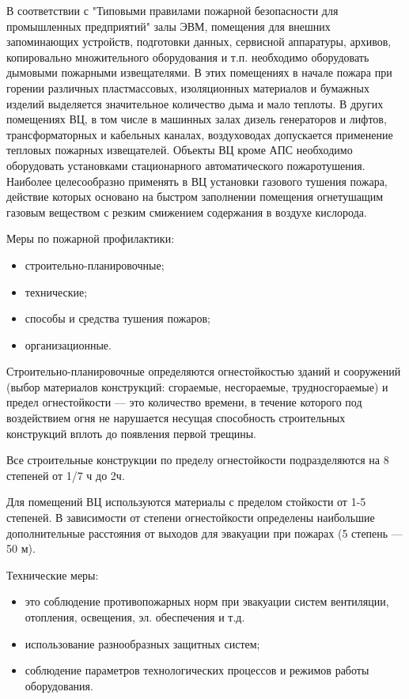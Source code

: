 В соответствии с "Типовыми правилами пожарной безопасности для промышленных предприятий" залы ЭВМ, помещения
для внешних запоминающих устройств, подготовки данных, сервисной аппаратуры, архивов, копировально множительного
оборудования и т.п. необходимо оборудовать дымовыми пожарными извещателями. В этих помещениях в начале пожара
при горении различных пластмассовых, изоляционных материалов и бумажных изделий выделяется значительное количество
дыма и мало теплоты. В других помещениях ВЦ, в том числе в машинных залах дизель генераторов и лифтов, трансформаторных
и кабельных каналах, воздуховодах допускается применение тепловых пожарных извещателей. Объекты ВЦ кроме АПС необходимо
оборудовать установками стационарного автоматического пожаротушения. Наиболее целесообразно применять в ВЦ установки
газового тушения пожара, действие которых основано на быстром заполнении помещения огнетушащим газовым веществом с
резким смижением содержания в воздухе кислорода.

Меры по пожарной профилактики:
\begin{itemize}
\item строительно-планировочные;
\item технические;
\item способы и средства тушения пожаров;
\item организационные.
\end{itemize}

Строительно-планировочные определяются огнестойкостью зданий и сооружений (выбор материалов конструкций: сгораемые, несгораемые,
трудносгораемые) и предел огнестойкости — это количество времени, в течение которого под воздействием огня не нарушается
несущая способность строительных конструкций вплоть до появления первой трещины.

Все строительные конструкции по пределу огнестойкости подразделяются на 8 степеней от 1/7 ч до 2ч.

Для помещений ВЦ используются материалы с пределом стойкости от 1-5 степеней. В зависимости от степени огнестойкости определены
наибольшие дополнительные расстояния от выходов для эвакуации при пожарах (5 степень — 50 м).

Технические меры:
\begin{itemize}
\item это соблюдение противопожарных норм при эвакуации систем вентиляции, отопления, освещения, эл. обеспечения и т.д.
\item использование разнообразных защитных систем;
\item соблюдение параметров технологических процессов и режимов работы оборудования.
\end{itemize}

